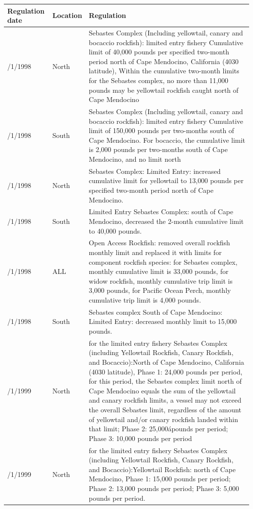 \documentclass[12pt,]{article}
\begin{document}
\begin{tabular}{>{\centering}p{.60in}>{\centering}p{1.0in}>{\raggedright}p{4.20in}}
  \hline
Regulation date & Location & Regulation \\ 
  \hline
1/1/1998 & 4030 North & Sebastes Complex (Including yellowtail, canary and bocaccio rockfish):  limited entry fishery  Cumulative limit of 40,000 pounds per specified two-month period north of Cape Mendocino, California (4030  latitude), Within the cumulative two-month limits for the Sebastes complex, no more than 11,000 pounds may be yellowtail rockfish caught north of Cape Mendocino \\ 
  1/1/1998 & 4030 South & Sebastes Complex (Including yellowtail, canary and bocaccio rockfish):  limited entry fishery  Cumulative limit of 150,000 pounds per two-months south of Cape Mendocino.   For bocaccio, the cumulative limit is 2,000 pounds per two-months south of Cape Mendocino, and no limit north  \\ 
  5/1/1998 & 4030 North & Sebastes Complex: Limited Entry:  increased cumulative limit for yellowtail to 13,000 pounds per specified two-month period north of Cape Mendocino. \\ 
  7/1/1998 & 4030 South & Limited Entry Sebastes Complex: south of Cape Mendocino, decreased the 2-month cumulative limit to 40,000 pounds. \\ 
  7/1/1998 & ALL & Open Access Rockfish: removed overall rockfish monthly limit and replaced it with limits for component rockfish species: for Sebastes complex, monthly cumulative limit is 33,000 pounds, for widow rockfish, monthly cumulative trip limit is 3,000 pounds, for Pacific Ocean Perch, monthly cumulative trip limit is 4,000 pounds. \\ 
  10/1/1998 & 4030 South & Sebastes complex South of Cape Mendocino: Limited Entry: decreased monthly limit to 15,000 pounds. \\ 
  1/1/1999 & 4030 North & for the limited entry fishery Sebastes Complex (including Yellowtail Rockfish, Canary Rockfish, and Bocaccio):North of Cape Mendocino, California (4030  latitude), Phase 1: 24,000 pounds per period, for this period, the Sebastes complex limit north of Cape Mendocino equals the sum of the yellowtail and canary rockfish limits, a vessel may not exceed the overall Sebastes limit, regardless of the amount of yellowtail and/or canary rockfish landed within that limit; Phase 2: 25,000ápounds per period; Phase 3: 10,000 pounds per period \\ 
  1/1/1999 & 4030 North & for the limited entry fishery Sebastes Complex (including Yellowtail Rockfish, Canary Rockfish, and Bocaccio):Yellowtail Rockfish: north of Cape Mendocino, Phase 1: 15,000 pounds per period; Phase 2: 13,000 pounds per period;  Phase 3: 5,000 pounds per period. \\ 

\end{tabular}
\end{document}
